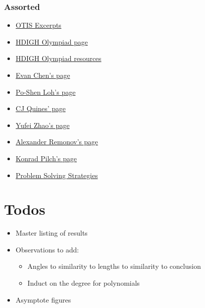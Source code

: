 \documentclass{amsart}
\begin{document}
\section{Assorted}
\begin{itemize}
  \item \href{https://web.evanchen.cc/textbooks/OTIS-Excerpts.pdf}{OTIS
      Excerpts}
  \item \href{https://how-did-i-get-here.com/olympiad/}{HDIGH Olympiad page}
  \item \href{https://how-did-i-get-here.com/olympiad-resources/}{HDIGH Olympiad
      resources}
  \item \href{https://web.evanchen.cc/olympiad.html}{Evan Chen's page}
  \item \href{https://www.math.cmu.edu/~ploh/olympiad.shtml}{Po-Shen Loh's page}
  \item \href{https://cjquines.com/math/competition-handouts}{CJ Quines' page}
  \item \href{https://yufeizhao.com/olympiad/}{Yufei Zhao's page}
  \item \href{https://alexanderrem.weebly.com/math-competitions.html}{Alexander
      Remonov's page}
  \item \href{https://www.its.caltech.edu/~kpilch/olympiad.html}{Konrad Pilch's
      page}
  \item
    \href{https://archive.org/download/ProblemSolvingStrategies/Problem\%20Solving\%20Strategies.pdf}
    {Problem Solving Strategies}
\end{itemize}

\part*{Todos}
\begin{itemize}
  \item Master listing of results
  \item Observations to add:
    \begin{itemize}
      \item Angles to similarity to lengths to similarity to conclusion
      \item Induct on the degree for polynomials
    \end{itemize}
  \item Asymptote figures
\end{itemize}
\end{document}
